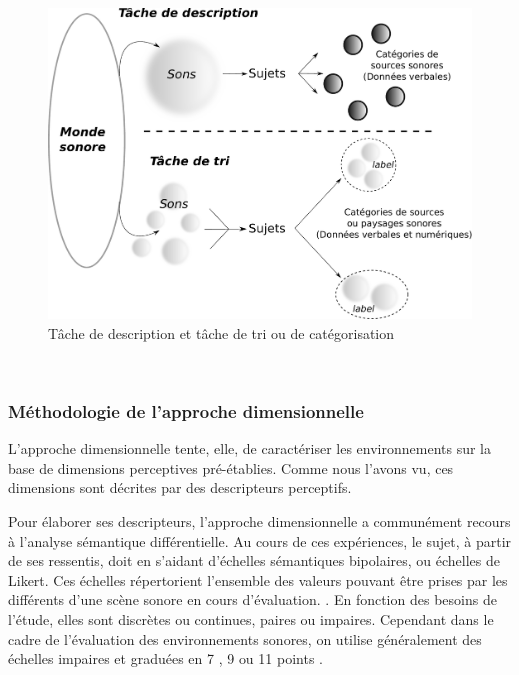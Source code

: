 \begin{figure}[bth]
        \myfloatalign
        \includegraphics[width=.8\linewidth]{gfx/desCat}
        \caption{Tâche de description et tâche de tri ou de catégorisation}\label{fig:descat}
\end{figure}

 \\

\subsubsection{Méthodologie de l'approche dimensionnelle}
\label{sec:appDimensionelle}

L'approche dimensionnelle tente, elle, de caractériser les environnements sur la base de dimensions perceptives pré-établies. Comme nous l'avons vu, ces dimensions sont décrites par des descripteurs perceptifs.

Pour élaborer ses descripteurs, l'approche dimensionnelle a communément recours à l'analyse sémantique différentielle. Au cours de ces expériences, le sujet, à partir de ses ressentis, doit  en s'aidant d'échelles sémantiques bipolaires, ou échelles de Likert. Ces échelles répertorient l'ensemble des valeurs pouvant être prises par les différents  d'une scène sonore en cours d'évaluation. . En fonction des besoins de l'étude, elles sont discrètes ou continues, paires ou impaires. Cependant dans le cadre de l'évaluation des environnements sonores, on utilise généralement des échelles impaires et graduées en 7 \citep{raimbault2006qualitative}, 9 \citep{hall2013exploratory} ou 11 points \citep{ricciardi2015sound}.

